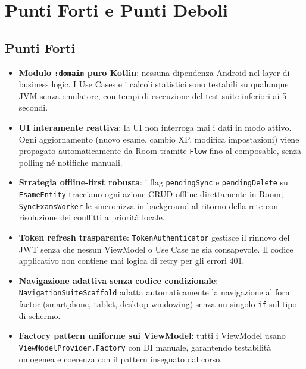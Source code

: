 \documentclass[a4paper,12pt]{report}
\begin{document}
    \chapter{Punti Forti e Punti Deboli}

    \section{Punti Forti}

    \begin{itemize}
        \item \textbf{Modulo \texttt{:domain} puro Kotlin}: nessuna dipendenza Android
        nel layer di business logic. I Use Cases e i calcoli statistici sono testabili
        su qualunque JVM senza emulatore, con tempi di esecuzione del test suite inferiori
        ai 5 secondi.

        \item \textbf{UI interamente reattiva}: la UI non interroga mai i dati in modo
        attivo. Ogni aggiornamento (nuovo esame, cambio XP, modifica impostazioni) viene
        propagato automaticamente da Room tramite \texttt{Flow} fino al composable,
        senza polling né notifiche manuali.

        \item \textbf{Strategia offline-first robusta}: i flag \texttt{pendingSync} e
        \texttt{pendingDelete} su \texttt{EsameEntity} tracciano ogni azione CRUD offline
        direttamente in Room; \texttt{SyncExamsWorker} le sincronizza in background al ritorno
        della rete con risoluzione dei conflitti a priorità locale.

        \item \textbf{Token refresh trasparente}: \texttt{TokenAuthenticator} gestisce
        il rinnovo del JWT senza che nessun ViewModel o Use Case ne sia consapevole.
        Il codice applicativo non contiene mai logica di retry per gli errori 401.

        \item \textbf{Navigazione adattiva senza codice condizionale}: \texttt{NavigationSuiteScaffold}
        adatta automaticamente la navigazione al form factor (smartphone, tablet, desktop
        windowing) senza un singolo \texttt{if} sul tipo di schermo.

        \item \textbf{Factory pattern uniforme sui ViewModel}: tutti i ViewModel usano
        \texttt{ViewModelProvider.Factory} con DI manuale, garantendo testabilità omogenea
        e coerenza con il pattern insegnato dal corso.
    \end{itemize}
\end{document}
